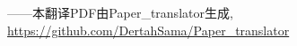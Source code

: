 \documentclass[oneside,onecolumn]{article}
\date{}
\title{}
\author{Author1, Author2}
\begin{document}
\begin{sloppypar}

\maketitle





\end{sloppypar}	
\begin{flushright}
	\vfill \footnotesize
	——本翻译PDF由Paper_translator生成, \url{https://github.com/DertahSama/Paper_translator}
\end{flushright}
\end{document}
